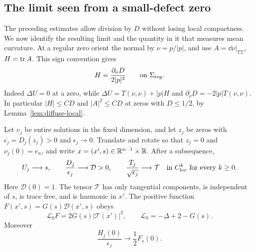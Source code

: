 \subsection{The limit seen from a small-defect zero}

The preceding estimates allow division by $D$ without losing local
compactness. We now identify the resulting limit and the quantity in it
that measures mean curvature.
At a regular zero orient the normal by $\nu=p/|p|$, and use
$A=\dd\nu|_{T\Sigma}$, $H=\operatorname{tr} A$. This sign convention gives
\begin{equation}\label{eq:diffuse-H}
 H=\frac{\partial_\nu D}{2|p|^2}\qquad\hbox{on }\Sigma_{\rm reg}.
\end{equation}
Indeed $\Delta U=0$ at a zero, while
$\Delta U=T(\nu,\nu)+|p|H$ and
$\partial_\nu D=-2|p|T(\nu,\nu)$.
In particular $|H|\le CD$ and $|A|^2\le CD$ at zeros with $D\le1/2$,
by Lemma~\ref{lem:diffuse-local}.

\begin{lemma}\label{lem:diffuse-compactness}
Let $v_j$ be entire solutions in the fixed dimension, and let $z_j$ be
zeros with $\epsilon_j=D_j(z_j)>0$ and $\epsilon_j\to0$.
Translate and rotate so that $z_j=0$ and $\nu_j(0)=e_n$, and write
$x=(x',s)\in\mathbb R^{n-1}\times\mathbb R$. After a subsequence,
\begin{equation}\label{eq:diffuse-limits}
 U_j\longrightarrow s,\qquad
 \frac{D_j}{\epsilon_j}\longrightarrow\mathcal D>0,\qquad
 \frac{T_j}{\sqrt{\epsilon_j}}\longrightarrow\mathcal T
 \quad\hbox{in }C^k_{\rm loc}\text{ for every }k\ge0.
\end{equation}
Here $\mathcal D(0)=1$. The tensor $\mathcal T$ has only tangential
components, is independent of $s$, is trace free, and is harmonic in
$x'$. The positive function $F(x',s)=G(s)\mathcal D(x',s)$ obeys
\begin{equation}\label{eq:diffuse-limit-operator}
 \mathcal L_0 F=2G(s)|\mathcal T(x')|^2,
 \qquad \mathcal L_0=-\Delta+2-G(s).
\end{equation}
Moreover
\begin{equation}\label{eq:diffuse-mean-limit}
 \frac{H_j(0)}{\epsilon_j}\longrightarrow\frac12F_s(0).
\end{equation}
\end{lemma}

